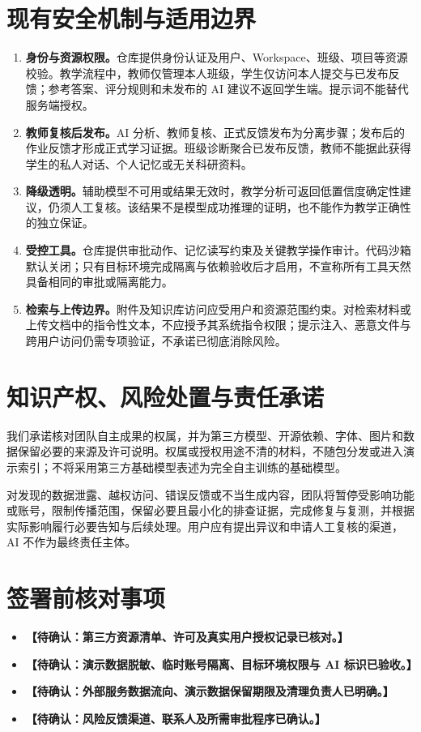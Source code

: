 \documentclass[UTF8,a4paper,zihao=-4,fontset=fandol]{ctexart}
\newcommand{\pending}[1]{\textbf{【待确认：#1】}}
\begin{document}
\section{现有安全机制与适用边界}
\begin{enumerate}
  \item \textbf{身份与资源权限。}仓库提供身份认证及用户、Workspace、班级、项目等资源校验。教学流程中，教师仅管理本人班级，学生仅访问本人提交与已发布反馈；参考答案、评分规则和未发布的 AI 建议不返回学生端。提示词不能替代服务端授权。
  \item \textbf{教师复核后发布。}AI 分析、教师复核、正式反馈发布为分离步骤；发布后的作业反馈才形成正式学习证据。班级诊断聚合已发布反馈，教师不能据此获得学生的私人对话、个人记忆或无关科研资料。
  \item \textbf{降级透明。}辅助模型不可用或结果无效时，教学分析可返回低置信度确定性建议，仍须人工复核。该结果不是模型成功推理的证明，也不能作为教学正确性的独立保证。
  \item \textbf{受控工具。}仓库提供审批动作、记忆读写约束及关键教学操作审计。代码沙箱默认关闭；只有目标环境完成隔离与依赖验收后才启用，不宣称所有工具天然具备相同的审批或隔离能力。
  \item \textbf{检索与上传边界。}附件及知识库访问应受用户和资源范围约束。对检索材料或上传文档中的指令性文本，不应授予其系统指令权限；提示注入、恶意文件与跨用户访问仍需专项验证，不承诺已彻底消除风险。
\end{enumerate}

\section{知识产权、风险处置与责任承诺}
我们承诺核对团队自主成果的权属，并为第三方模型、开源依赖、字体、图片和数据保留必要的来源及许可说明。权属或授权用途不清的材料，不随包分发或进入演示索引；不将采用第三方基础模型表述为完全自主训练的基础模型。

对发现的数据泄露、越权访问、错误反馈或不当生成内容，团队将暂停受影响功能或账号，限制传播范围，保留必要且最小化的排查证据，完成修复与复测，并根据实际影响履行必要告知与后续处理。用户应有提出异议和申请人工复核的渠道，AI 不作为最终责任主体。

\section{签署前核对事项}
\begin{itemize}
  \item \pending{第三方资源清单、许可及真实用户授权记录已核对。}
  \item \pending{演示数据脱敏、临时账号隔离、目标环境权限与 AI 标识已验收。}
  \item \pending{外部服务数据流向、演示数据保留期限及清理负责人已明确。}
  \item \pending{风险反馈渠道、联系人及所需审批程序已确认。}
\end{itemize}
\end{document}
